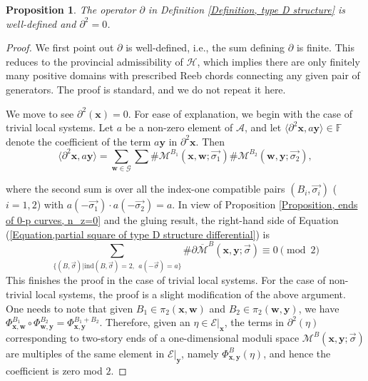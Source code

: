 \documentclass{amsart}
\newtheorem{prop}[thm]{Proposition}
\theoremstyle{definition}
\theoremstyle{remark}
\numberwithin{equation}{section}
\numberwithin{equation}{section} \makeatletter
\begin{document}
\begin{prop}\label{Proposition, type D structure is well defined}
The operator $\partial$ in Definition \ref{Definition, type D structure} is well-defined and $\partial^2=0$. 
\end{prop}
\begin{proof}
We first point out $\partial$ is well-defined, i.e., the sum defining $\partial$ is finite. This reduces to the provincial admissibility of $\mathcal{H}$, which implies there are only finitely many positive domains with prescribed Reeb chords connecting any given pair of generators. The proof is standard, and we do not repeat it here. 

We move to see $\partial^2(\bm{x})=0$. For ease of explanation, we begin with the case of trivial local systems. Let $a$ be a non-zero element of $\mathcal{A}$, and let $\langle \partial^2 \bm{x},a\bm{y}\rangle \in \mathbb{F}$ denote the coefficient of the term $a\bm{y}$ in $\partial^2 \bm{x}$. Then 
\begin{equation}\label{Equation,partial square of type D structure differential}
\langle \partial^2 \bm{x},a\bm{y}\rangle=\sum_{\bm{w}\in\mathcal{G}}\sum \#\mathcal{M}^{B_1}(\bm{x},\bm{w};\overrightarrow{\sigma_1})\#\mathcal{M}^{B_2}(\bm{w},\bm{y};\overrightarrow{\sigma_2}), 
\end{equation}


where the second sum is over all the index-one compatible pairs $(B_i,\overrightarrow{\sigma_i})$ ($i=1,2$) with $a(-\overrightarrow{\sigma_1})\cdot a(-\overrightarrow{\sigma_2})=a$. 
In view of Proposition \ref{Proposition, ends of 0-p curves, n_z=0} and the gluing result, the right-hand side of Equation (\ref{Equation,partial square of type D structure differential}) is $$\sum_{\{(B,\overrightarrow{\sigma})|\text{ind}(B,\overrightarrow{\sigma})=2,\ \ a(-\overrightarrow{\sigma})=a\}}\#\partial \overline{\mathcal{M}}^B(\bm{x},\bm{y};\overrightarrow{\sigma})\equiv 0 \pmod 2$$
This finishes the proof in the case of trivial local systems. For the case of non-trivial local systems, the proof is a slight modification of the above argument. One needs to note that given $B_1\in\pi_2(\bm{x},\bm{w})$ and $B_2\in \pi_2(\bm{w},\bm{y})$, we have $\Phi_{\bm{x},\bm{w}}^{B_1}\circ \Phi_{\bm{w},\bm{y}}^{B_2}=\Phi_{\bm{x},\bm{y}}^{B_1+B_2}$. Therefore, given an $\eta\in \mathcal{E}|_{\bm{x}}$, the terms in $\partial^2(\eta)$ corresponding to two-story ends of a one-dimensional moduli space $\mathcal{M}^B(\bm{x},\bm{y};\overrightarrow{\sigma})$ are multiples of the same element in $\mathcal{E}|_{\bm{y}}$, namely $\Phi_{\bm{x},\bm{y}}^B(\eta)$, and hence the coefficient is zero mod $2$. 
\end{proof}
 
\end{document}
